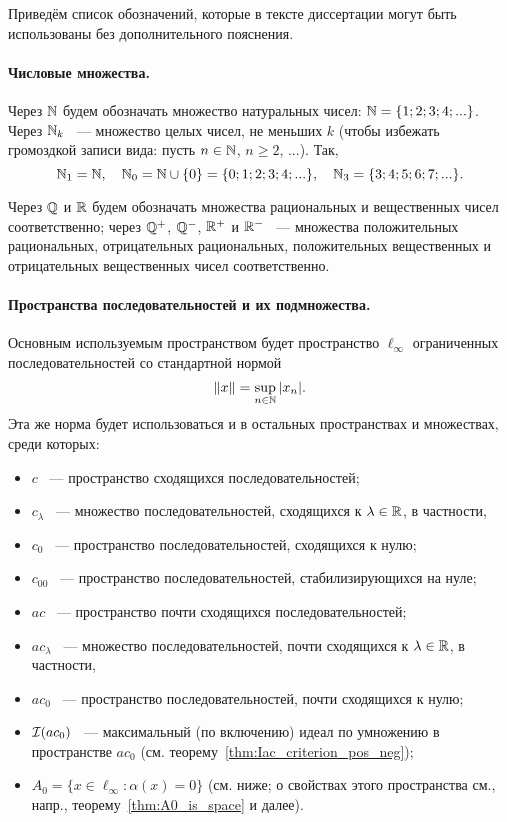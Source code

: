 Приведём список обозначений, которые в тексте диссертации могут быть использованы без дополнительного пояснения.


\paragraph{Числовые множества.}
Через $\mathbb{N}$ будем обозначать множество натуральных чисел: $\mathbb{N} = \{1;2;3;4;...\}$.
Через $\mathbb{N}_k$ ~--- множество целых чисел, не меньших $k$ (чтобы избежать громоздкой записи вида: пусть $n\in \mathbb{N}$, $n \geq 2$, ...).
Так,
\begin{equation}
	\mathbb{N}_1 = \mathbb{N}
	,
	\quad
	\mathbb{N}_0 = \mathbb{N} \cup\{0\} = \{0;1;2;3;4;...\}
	,
	\quad
	\mathbb{N}_3 = \{3;4;5;6;7;...\}
	.
\end{equation}

Через $\mathbb{Q}$ и $\mathbb{R}$ будем обозначать множества рациональных и вещественных чисел соответственно;
через $\mathbb{Q}^+$, $\mathbb{Q}^-$, $\mathbb{R}^+$ и $\mathbb{R}^-$ ~--- множества положительных рациональных, отрицательных рациональных,
положительных вещественных и отрицательных вещественных чисел соответственно.

\paragraph{Пространства последовательностей и их подмножества.}

Основным используемым пространством будет пространство $\ell_\infty$ ограниченных последовательностей со стандартной нормой
\begin{equation}
	\|x\| = \sup_{n\in\mathbb{N}} |x_n|
	.
\end{equation}
Эта же норма будет использоваться и в остальных пространствах и множествах, среди которых:
\begin{itemize}
	\item
		$c$ ~--- пространство сходящихся последовательностей;
	\item
		$c_\lambda$ ~--- множество последовательностей, сходящихся к $\lambda \in \mathbb{R}$, в частности,
	\item
		$c_0$ ~--- пространство последовательностей, сходящихся к нулю;
	\item
		$c_{00}$ ~--- пространство последовательностей, стабилизирующихся на нуле;
	\item
		$ac$ ~--- пространство почти сходящихся последовательностей;
	\item
		$ac_\lambda$ ~--- множество последовательностей, почти сходящихся к $\lambda \in \mathbb{R}$, в частности,
	\item
		$ac_0$ ~--- пространство последовательностей, почти сходящихся к нулю;
	\item
		$\mathcal{I}(ac_0)$ ~--- максимальный (по включению) идеал по умножению в пространстве $ac_0$ (см. теорему~\ref{thm:Iac_criterion_pos_neg});
	\item
		$A_0 = \{ x\in\ell_\infty : \alpha(x) = 0\}$ (см. ниже; о свойствах этого пространства см., напр., теорему~\ref{thm:A0_is_space} и далее).
\end{itemize}



